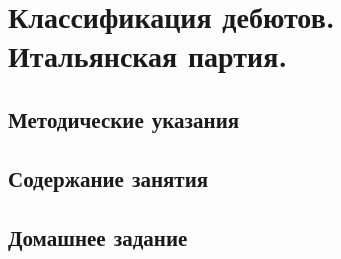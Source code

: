 \chapter{Классификация дебютов. Итальянская партия.}

\section{Методические указания}


\section{Содержание занятия}


\section{Домашнее задание}

